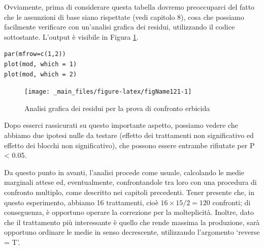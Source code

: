 \documentclass[a4paper,12pt,oneside]{book}
\begin{document}
Ovviamente, prima di considerare questa tabella dovremo preoccuparci del fatto che le assunzioni di base siano rispettate (vedi capitolo 8), cosa che possiamo facilmente verificare con un'analisi grafica dei residui, utilizzando il codice sottostante. L'output è visibile in Figura \ref{fig:figName121}.

\begin{verbatim}
par(mfrow=c(1,2))
plot(mod, which = 1)
plot(mod, which = 2)
\end{verbatim}

\begin{figure}

{\centering \texttt{[image: \_main\_files/figure-latex/figName121-1]} 

}

\caption{Analisi grafica dei residui per la prova di confronto erbicida}\label{fig:figName121}
\end{figure}

Dopo esserci rassicurati su questo importante aspetto, possiamo vedere che abbiamo due ipotesi nulle da testare (effetto dei trattamenti non significativo ed effetto dei blocchi non significativo), che possono essere entrambe rifiutate per P \textless{} 0.05.

Da questo punto in avanti, l'analisi procede come usuale, calcolando le medie marginali attese ed, eventualmente, confrontandole tra loro con una procedura di confronto multiplo, come descritto nei capitoli precedenti. Tener presente che, in questo esperimento, abbiamo 16 trattamenti, cioè \(16 \times 15 / 2 = 120\) confronti; di conseguenza, è opportuno operare la correzione per la molteplicità. Inoltre, dato che il trattamento più interessante è quello che rende massima la produzione, sarà opportuno ordinare le medie in senso decrescente, utilizzando l'argomento `reverse = T'.

\scriptsize
\end{document}

